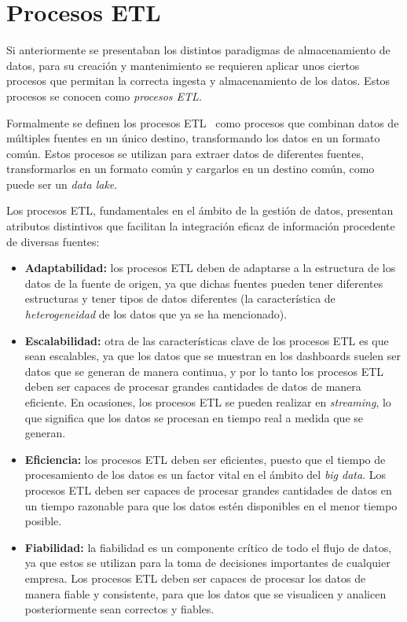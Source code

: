 \newpage{}
\section{Procesos ETL}\label{sec:etl}
Si anteriormente se presentaban los distintos paradigmas de almacenamiento de
datos, para su creación y mantenimiento se requieren aplicar unos ciertos
procesos que permitan la correcta ingesta y almacenamiento de los datos. Estos
procesos se conocen como \textit{procesos ETL}.

Formalmente se definen los procesos ETL~\cite{mier2023dashboards} como procesos
que combinan datos de múltiples fuentes en un único destino, transformando los
datos en un formato común. Estos procesos se utilizan para extraer datos de
diferentes fuentes, transformarlos en un formato común y cargarlos en un destino
común, como puede ser un \textit{data lake}.

Los procesos ETL, fundamentales en el ámbito de la gestión de datos, presentan
atributos distintivos que facilitan la integración eficaz de información
procedente de diversas fuentes:

\begin{itemize}
	\item \textbf{Adaptabilidad:} los procesos ETL deben de adaptarse a la
		estructura de los datos de la fuente de origen, ya que dichas fuentes
		pueden tener diferentes estructuras y tener tipos de datos diferentes
		(la característica de \textit{heterogeneidad} de los datos que ya se ha
		mencionado).
	\item \textbf{Escalabilidad:} otra de las características clave de los
		procesos ETL es que sean escalables, ya que los datos que se muestran en
		los dashboards suelen ser datos que se generan de manera continua, y por
		lo tanto los procesos ETL deben ser capaces de procesar grandes
		cantidades de datos de manera eficiente. En ocasiones, los procesos ETL
		se pueden realizar en \textit{streaming}, lo que significa que los datos
		se procesan en tiempo real a medida que se generan.
	\item \textbf{Eficiencia:} los procesos ETL deben ser eficientes, puesto que
		el tiempo de procesamiento de los datos es un factor vital en el ámbito
		del \textit{big data}. Los procesos ETL deben ser capaces de procesar
		grandes cantidades de datos en un tiempo razonable para que los datos
		estén disponibles en el menor tiempo posible.
	\item \textbf{Fiabilidad:} la fiabilidad es un componente crítico de todo el
		flujo de datos, ya que estos se utilizan para la toma de decisiones
		importantes de cualquier empresa. Los procesos ETL deben ser capaces de
		procesar los datos de manera fiable y consistente, para que los datos
		que se visualicen y analicen posteriormente sean correctos y fiables.
\end{itemize}


